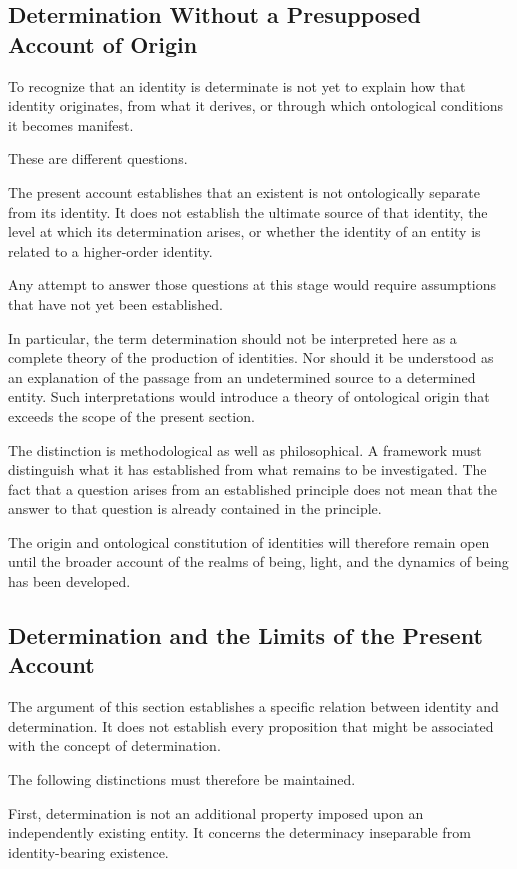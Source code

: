 \subsection{Determination Without a Presupposed Account of Origin}

To recognize that an identity is determinate is not yet to
explain how that identity originates, from what it derives,
or through which ontological conditions it becomes manifest.

These are different questions.

The present account establishes that an existent is not
ontologically separate from its identity. It does not establish
the ultimate source of that identity, the level at which its
determination arises, or whether the identity of an entity
is related to a higher-order identity.

Any attempt to answer those questions at this stage would
require assumptions that have not yet been established.

In particular, the term determination should not be interpreted
here as a complete theory of the production of identities.
Nor should it be understood as an explanation of the passage
from an undetermined source to a determined entity. Such
interpretations would introduce a theory of ontological origin
that exceeds the scope of the present section.

The distinction is methodological as well as philosophical.
A framework must distinguish what it has established from
what remains to be investigated. The fact that a question
arises from an established principle does not mean that the
answer to that question is already contained in the principle.

The origin and ontological constitution of identities will
therefore remain open until the broader account of the realms
of being, light, and the dynamics of being has been developed.

\subsection{Determination and the Limits of the Present Account}

The argument of this section establishes a specific relation
between identity and determination. It does not establish
every proposition that might be associated with the concept
of determination.

The following distinctions must therefore be maintained.

First, determination is not an additional property imposed
upon an independently existing entity. It concerns the
determinacy inseparable from identity-bearing existence.

